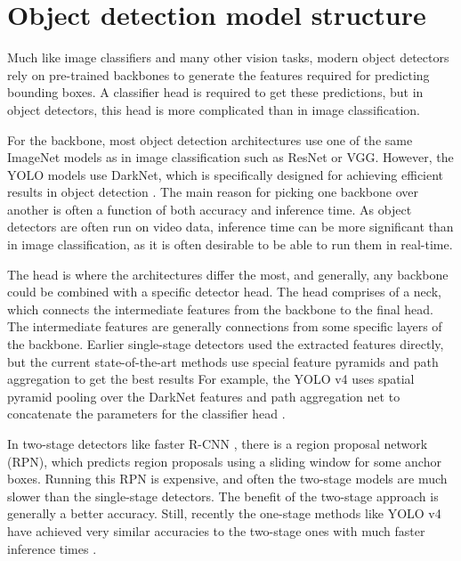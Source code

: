 \section{Object detection model structure}
Much like image classifiers and many other vision tasks, modern object detectors rely on pre-trained backbones to generate the features required for predicting bounding boxes.
A classifier head is required to get these predictions, but in object detectors, this head is more complicated than in image classification.

For the backbone, most object detection architectures use one of the same ImageNet models as in image classification such as ResNet or VGG.
However, the YOLO models use DarkNet, which is specifically designed for achieving efficient results in object detection \citep{yolov4}.
The main reason for picking one backbone over another is often a function of both accuracy and inference time.
As object detectors are often run on video data, inference time can be more significant than in image classification, as it is often desirable to be able to run them in real-time.

The head is where the architectures differ the most, and generally, any backbone could be combined with a specific detector head.
The head comprises of a neck, which connects the intermediate features from the backbone to the final head.
The intermediate features are generally connections from some specific layers of the backbone.
Earlier single-stage detectors used the extracted features directly, but the current state-of-the-art methods use special feature pyramids and path aggregation to get the best results \citep{efficientDet}
For example, the YOLO v4 uses spatial pyramid pooling \citep{SPP} over the DarkNet features and path aggregation net \citep{PANET} to concatenate the parameters for the classifier head \citep{yolov4}.

In two-stage detectors like faster R-CNN \citep{faster-rcnn}, there is a region proposal network (RPN), which predicts region proposals using a sliding window for some anchor boxes.
Running this RPN is expensive, and often the two-stage models are much slower than the single-stage detectors.
The benefit of the two-stage approach is generally a better accuracy. 
Still, recently the one-stage methods like YOLO v4 have achieved very similar accuracies to the two-stage ones with much faster inference times \citep{yolov4}.

